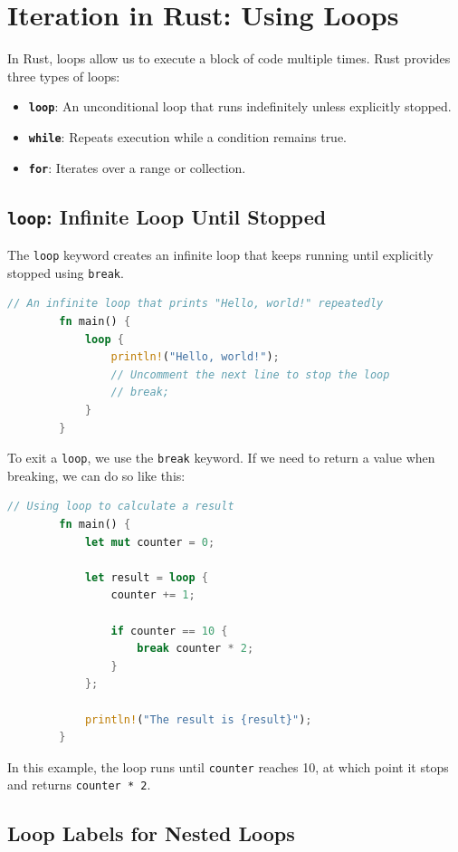 \documentclass[a4paper,12pt]{report}
\begin{document}
	
	
	\section{Iteration in Rust: Using Loops}
	In Rust, loops allow us to execute a block of code multiple times. Rust provides three types of loops: 
	
	\begin{itemize}
		\item \textbf{\texttt{loop}}: An unconditional loop that runs indefinitely unless explicitly stopped.
		\item \textbf{\texttt{while}}: Repeats execution while a condition remains true.
		\item \textbf{\texttt{for}}: Iterates over a range or collection.
	\end{itemize}
	
	\subsection*{\texttt{loop}: Infinite Loop Until Stopped}
	
	The \texttt{loop} keyword creates an infinite loop that keeps running until explicitly stopped using \texttt{break}.
	
	\begin{lstlisting}[language=Rust]
		// An infinite loop that prints "Hello, world!" repeatedly
		fn main() {
			loop {
				println!("Hello, world!");
				// Uncomment the next line to stop the loop
				// break;
			}
		}
	\end{lstlisting}
	
		\noindent To exit a \texttt{loop}, we use the \texttt{break} keyword. If we need to return a value when breaking, we can do so like this:
	
	\begin{lstlisting}[language=Rust]
		// Using loop to calculate a result
		fn main() {
			let mut counter = 0;
			
			let result = loop {
				counter += 1;
				
				if counter == 10 {
					break counter * 2;
				}
			};
			
			println!("The result is {result}");
		}
	\end{lstlisting}
	
		\noindent In this example, the loop runs until \texttt{counter} reaches 10, at which point it stops and returns \texttt{counter * 2}.
	
	\subsection*{Loop Labels for Nested Loops}
	
\end{document}
